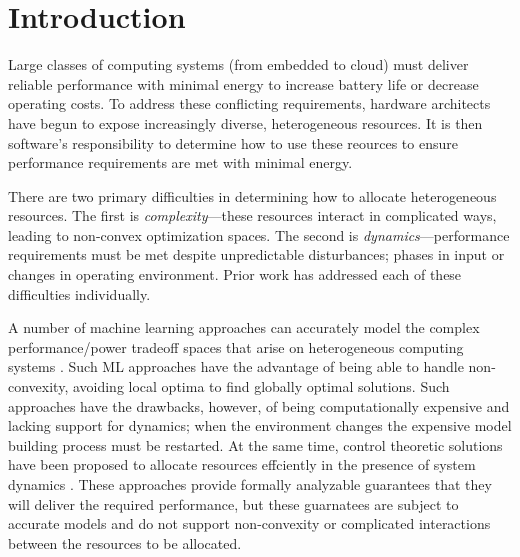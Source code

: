 \section{Introduction}
Large classes of computing systems (from embedded to cloud) must
deliver reliable performance with minimal energy to increase battery
life or decrease operating costs.  To address these conflicting
requirements, hardware architects have begun to expose increasingly
diverse, heterogeneous resources.  It is then software's
responsibility to determine how to use these reources to ensure
performance requirements are met with minimal energy.


There are two primary difficulties in determining how to allocate
heterogeneous resources.  The first is \emph{complexity}---these
resources interact in complicated ways, leading to non-convex
optimization spaces.  The second is \emph{dynamics}---performance
requirements must be met despite unpredictable disturbances; \eg{}
phases in input or changes in operating environment.  Prior work has
addressed each of these difficulties individually.

A number of machine learning approaches can accurately model the
complex performance/power tradeoff spaces that arise on heterogeneous
computing systems
\cite{reddiHPCA2013,dubach2010,Bitirgen2008,Ipek,Koala,LEO,Flicker,Ponamarev}.
Such ML approaches have the advantage of being able to handle
non-convexity, avoiding local optima to find globally optimal
solutions.  Such approaches have the drawbacks, however, of being
computationally expensive and lacking support for dynamics; \ie{} when
the environment changes the expensive model building process must be
restarted.  At the same time, control theoretic solutions have been
proposed to allocate resources effciently in the presence of system
dynamics
\cite{Hellerstein2004a,Chen2011,PTRADE,POET,ControlWare,Agilos,grace2}.
These approaches provide formally analyzable guarantees that they will
deliver the required performance, but these guarnatees are subject to
accurate models and do not support non-convexity or complicated
interactions between the resources to be allocated.


